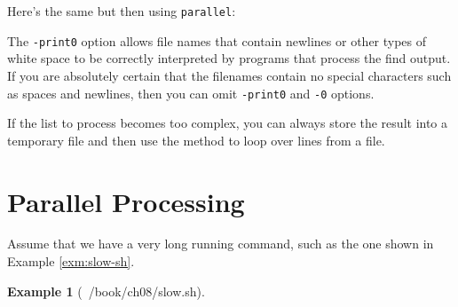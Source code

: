 \documentclass[
]{book}
\newenvironment{Shaded}{\begin{snugshade}}{\end{snugshade}}
\newcommand{\BuiltInTok}[1]{#1}
\newcommand{\CommentTok}[1]{\textcolor[rgb]{0.56,0.35,0.01}{\textit{#1}}}
\newcommand{\ExtensionTok}[1]{#1}
\newcommand{\FunctionTok}[1]{\textcolor[rgb]{0.00,0.00,0.00}{#1}}
\newcommand{\KeywordTok}[1]{\textcolor[rgb]{0.13,0.29,0.53}{\textbf{#1}}}
\newcommand{\NormalTok}[1]{#1}
\newcommand{\StringTok}[1]{\textcolor[rgb]{0.31,0.60,0.02}{#1}}
\newcommand{\VariableTok}[1]{\textcolor[rgb]{0.00,0.00,0.00}{#1}}
\theoremstyle{definition}
\theoremstyle{definition}
\newtheorem{example}{Example}[chapter]
\theoremstyle{definition}
\theoremstyle{remark}
\begin{document}
Here's the same but then using \texttt{parallel}:

\begin{Shaded}
\end{Shaded}

The \texttt{-print0} option allows file names that contain newlines or other types of white space to be correctly interpreted by programs that process the find output. If you are absolutely certain that the filenames contain no special characters such as spaces and newlines, then you can omit \texttt{-print0} and \texttt{-0} options.

\begin{rmdtip}
If the list to process becomes too complex, you can always store the result into a temporary file and then use the method to loop over lines from a file.
\end{rmdtip}

\hypertarget{parallel-processing}{%
\section{Parallel Processing}\label{parallel-processing}}

Assume that we have a very long running command, such as the one shown in Example \ref{exm:slow-sh}.

\begin{example}[~/book/ch08/slow.sh]
\protect\hypertarget{exm:slow-sh}{}{\label{exm:slow-sh} {} }
\end{example}

\begin{Shaded}
\end{Shaded}
\end{document}
